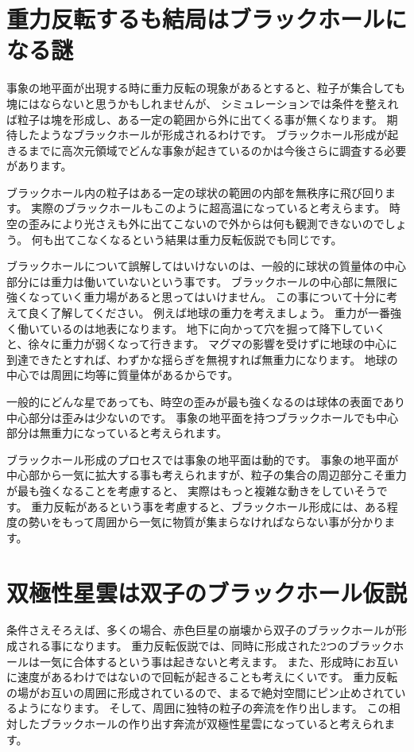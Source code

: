 \documentclass[a4paper,12pt,notitlepage]{jsreport}
\begin{document}
\section{重力反転するも結局はブラックホールになる謎}

事象の地平面が出現する時に重力反転の現象があるとすると、粒子が集合しても塊にはならないと思うかもしれませんが、
シミュレーションでは条件を整えれば粒子は塊を形成し、ある一定の範囲から外に出てくる事が無くなります。
期待したようなブラックホールが形成されるわけです。
ブラックホール形成が起きるまでに高次元領域でどんな事象が起きているのかは今後さらに調査する必要があります。

ブラックホール内の粒子はある一定の球状の範囲の内部を無秩序に飛び回ります。
実際のブラックホールもこのように超高温になっていると考えらます。
時空の歪みにより光さえも外に出てこないので外からは何も観測できないのでしょう。
何も出てこなくなるという結果は重力反転仮説でも同じです。

ブラックホールについて誤解してはいけないのは、一般的に球状の質量体の中心部分には重力は働いていないという事です。
ブラックホールの中心部に無限に強くなっていく重力場があると思ってはいけません。
この事について十分に考えて良く了解してください。
例えば地球の重力を考えましょう。
重力が一番強く働いているのは地表になります。
地下に向かって穴を掘って降下していくと、徐々に重力が弱くなって行きます。
マグマの影響を受けずに地球の中心に到達できたとすれば、わずかな揺らぎを無視すれば無重力になります。
地球の中心では周囲に均等に質量体があるからです。

一般的にどんな星であっても、時空の歪みが最も強くなるのは球体の表面であり中心部分は歪みは少ないのです。
事象の地平面を持つブラックホールでも中心部分は無重力になっていると考えられます。

ブラックホール形成のプロセスでは事象の地平面は動的です。
事象の地平面が中心部から一気に拡大する事も考えられますが、粒子の集合の周辺部分こそ重力が最も強くなることを考慮すると、
実際はもっと複雑な動きをしていそうです。
重力反転があるという事を考慮すると、ブラックホール形成には、ある程度の勢いをもって周囲から一気に物質が集まらなければならない事が分かります。

\section{双極性星雲は双子のブラックホール仮説}

条件さえそろえば、多くの場合、赤色巨星の崩壊から双子のブラックホールが形成される事になります。
重力反転仮説では、同時に形成された2つのブラックホールは一気に合体するという事は起きないと考えます。
また、形成時にお互いに速度があるわけではないので回転が起きることも考えにくいです。
重力反転の場がお互いの周囲に形成されているので、まるで絶対空間にピン止めされているようになります。
そして、周囲に独特の粒子の奔流を作り出します。
この相対したブラックホールの作り出す奔流が双極性星雲になっていると考えられます。
\end{document}
